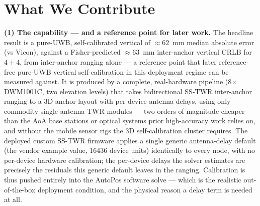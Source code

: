 \documentclass[11pt,a4paper]{article}
\begin{document}
\section{What We Contribute}

\textbf{(1) The capability --- and a reference point for later work.} The headline result is a
pure-UWB, self-calibrated vertical of ${\approx}62$~mm median absolute error (vs Vicon), against a Fisher-predicted ${\approx}63$~mm
inter-anchor vertical CRLB for $4{+}4$, from inter-anchor ranging alone --- a reference point that later
reference-free pure-UWB vertical self-calibration in this deployment regime can be measured against. It is produced by a
complete, real-hardware pipeline (8$\times$ DWM1001C, two elevation levels) that takes bidirectional
SS-TWR inter-anchor ranging to a 3D anchor layout with per-device antenna delays, using only commodity
single-antenna TWR modules --- two orders of magnitude cheaper
than the AoA base stations \citep{zihajehzadeh_2017} or optical systems prior high-accuracy work
relies on, and without the mobile sensor rigs the 3D self-calibration cluster requires. The deployed
custom SS-TWR firmware applies a single generic antenna-delay default (the vendor example value,
16436 device units) identically to every node, with no per-device hardware calibration; the
per-device delays the solver estimates are precisely the residuals this generic default leaves in the
ranging. Calibration is thus pushed entirely into the AutoPos software solve --- which is the
realistic out-of-the-box deployment condition, and the physical reason a delay term is needed at all.
\end{document}
